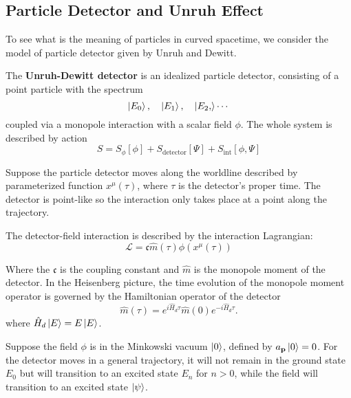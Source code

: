 \documentclass[12pt]{article}
\numberwithin{equation}{section}
\theoremstyle{1style}
\newcommand{\tbf}[1]{\textbf{#1}}
\begin{document}
\subsection{Particle Detector and Unruh Effect}
To see what is the meaning of particles in curved spacetime, we consider the model of particle detector given by Unruh and Dewitt.

The \tbf{Unruh-Dewitt detector} is an idealized particle detector,
consisting of a point particle with the spectrum
\begin{equation}
  \ket{E_0},\quad \ket{E_1},\quad \ket{E_2,} \cdots
\end{equation}
coupled via a monopole interaction with a scalar field \(\phi\).
The whole system is described by action
\begin{equation}
  S=S_{\phi}\left[\phi\right]+S_{\text{detector}}\left[\Psi\right]+S_{\text{int}}\left[\phi,\Psi\right]
\end{equation}



Suppose the particle detector moves along the worldline described by parameterized function \(x^\mu(\tau)\),
where \(\tau\) is the detector's proper time.
The detector is point-like so the interaction only takes place at a point along the trajectory.

\par The detector-field interaction is described by the interaction Lagrangian:
\begin{equation}
  \mathcal{L}=\mathfrak{c} \hat{m}(\tau)\phi\left(x^{\mu}(\tau)\right)
\end{equation}

Where the \(\mathfrak{c}\) is the coupling constant and \(\hat{m}\) is the monopole moment of the detector.
In the Heisenberg picture, the time evolution of the monopole moment operator is governed by the Hamiltonian operator of the detector
\begin{equation}
  \hat{m}(\tau)= e^{i\hat{H}_d\tau}\hat{m}(0)e^{-i\hat{H}_d\tau}.
\end{equation}
where \(\hat{H}_d\ket{E}=E\ket{E}\).

Suppose the field \(\phi\) is in the Minkowski vacuum \(\ket{0}\), defined by \(a_{\mathbf{p}}\ket{0}=0\).
For the detector moves in a general trajectory,
it will not remain in the ground state \(E_0\) but will transition to an excited state \(E_n\) for \(n>0\),
while the field will transition to an excited state \(\ket{\psi}\).
\end{document}
